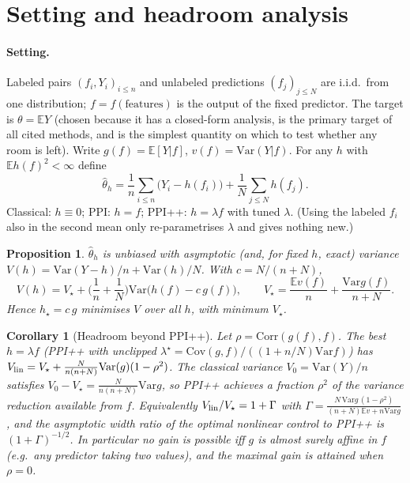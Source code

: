 \documentclass{article}
\newcommand{\E}{\mathbb{E}}
\newcommand{\Var}{\mathrm{Var}}
\newcommand{\Cov}{\mathrm{Cov}}
\newtheorem{proposition}{Proposition}
\newtheorem{corollary}{Corollary}
\begin{document}
\section{Setting and headroom analysis}\label{sec:theory}
\paragraph{Setting.} Labeled pairs $(f_i,Y_i)_{i\le n}$ and unlabeled predictions $(f_j)_{j\le N}$ are i.i.d.\ from one distribution; $f=f(\text{features})$ is the output of the fixed predictor. The target is $\theta=\E Y$ (chosen because it has a closed-form analysis, is the primary target of all cited methods, and is the simplest quantity on which to test whether any room is left). Write $g(f)=\E[Y|f]$, $v(f)=\Var(Y|f)$. For any $h$ with $\E h(f)^2<\infty$ define
\begin{equation}\label{eq:est}
\hat\theta_h=\frac1n\sum_{i\le n}\big(Y_i-h(f_i)\big)+\frac1N\sum_{j\le N}h(f_j).
\end{equation}
Classical: $h\equiv0$; PPI: $h=f$; PPI++: $h=\lambda f$ with tuned $\lambda$. (Using the labeled $f_i$ also in the second mean only re-parametrises $\lambda$ and gives nothing new.)

\begin{proposition}\label{prop:main}
$\hat\theta_h$ is unbiased with asymptotic (and, for fixed $h$, exact) variance $V(h)=\Var(Y-h)/n+\Var(h)/N$. With $c=N/(n+N)$,
\[
V(h)=V_\star+\Big(\frac1n+\frac1N\Big)\Var\big(h(f)-c\,g(f)\big),\qquad V_\star=\frac{\E v(f)}{n}+\frac{\Var g(f)}{n+N}.
\]
Hence $h_\star=c\,g$ minimises $V$ over all $h$, with minimum $V_\star$.
\end{proposition}

\begin{corollary}[Headroom beyond PPI++]\label{cor:lin}
Let $\rho=\mathrm{Corr}(g(f),f)$. The best $h=\lambda f$ (PPI++ with unclipped $\lambda^\star=\Cov(g,f)/((1+n/N)\Var f)$) has $V_{\rm lin}=V_\star+\frac{N}{n(n+N)}\Var(g)(1-\rho^2)$. The classical variance $V_0=\Var(Y)/n$ satisfies $V_0-V_\star=\frac{N}{n(n+N)}\Var g$, so PPI++ achieves a fraction $\rho^2$ of the variance reduction available from $f$. Equivalently $V_{\rm lin}/V_\star=1+\Gamma$ with $\Gamma=\frac{N\,\Var g\,(1-\rho^2)}{(n+N)\E v+n\Var g}$, and the asymptotic width ratio of the optimal nonlinear control to PPI++ is $(1+\Gamma)^{-1/2}$. In particular no gain is possible iff $g$ is almost surely affine in $f$ (e.g.\ any predictor taking two values), and the maximal gain is attained when $\rho=0$.
\end{corollary}
\end{document}
